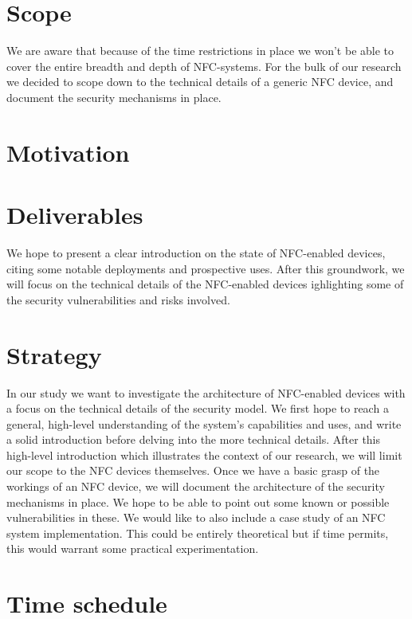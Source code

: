 \documentclass[11pt]{article} %
\begin{document}
\section{Scope}
We are aware that because of the time restrictions in place we won't be able to cover the entire breadth and depth of NFC-systems. For the bulk of our research we decided to scope down to the technical details of a generic NFC device, and document the security mechanisms in place.

\section{Motivation}

\section{Deliverables}
We hope to present a clear introduction on the state of NFC-enabled devices, citing some notable deployments and prospective uses.
After this groundwork, we will focus on the technical details of the NFC-enabled devices ighlighting some of the security vulnerabilities and risks involved.


\section{Strategy}
In our study we want to investigate the architecture of NFC-enabled devices with a focus on the technical details of the security model. We first hope to reach a general, high-level understanding of the system's capabilities and uses, and write a solid introduction before delving into the more technical details. After this high-level introduction which illustrates the context of our research, we will limit our scope to the NFC devices themselves.
Once we have a basic grasp of the workings of an NFC device, we will document the architecture of the security mechanisms in place. We hope to be able to point out some known or possible vulnerabilities in these.
We would like to also include a case study of an NFC system implementation. This could be entirely theoretical but if time permits, this would warrant some practical experimentation.

\section{Time schedule}


\end{document}
